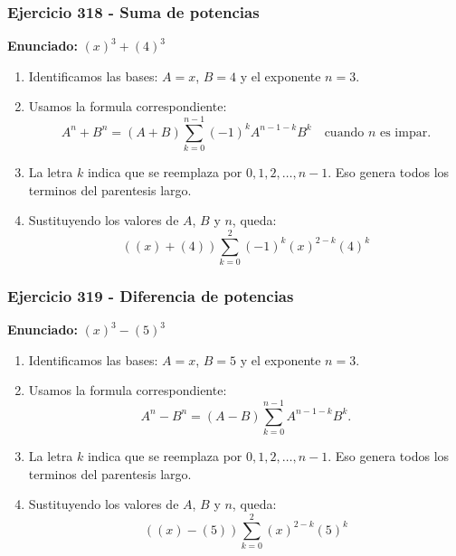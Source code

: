 \documentclass[11pt,a4paper]{article}
\begin{document}
\subsubsection*{Ejercicio 318 - Suma de potencias}
\textbf{Enunciado:} $ \left(x\right)^{3}+\left(4\right)^{3} $\par
\begin{enumerate}[leftmargin=2em]
\item Identificamos las bases: \(A=x\), \(B=4\) y el exponente \(n=3\).
\item Usamos la formula correspondiente: \[A^n+B^n=(A+B)\sum_{k=0}^{n-1}(-1)^kA^{n-1-k}B^k\quad\text{cuando }n\text{ es impar}.\]
\item La letra \(k\) indica que se reemplaza por \(0,1,2,\ldots,n-1\). Eso genera todos los terminos del parentesis largo.
\item Sustituyendo los valores de \(A\), \(B\) y \(n\), queda: \[\boxed{\left(\left(x\right)+\left(4\right)\right)\sum_{k=0}^{2}(-1)^k\left(x\right)^{2-k}\left(4\right)^k}\]
\end{enumerate}

\vspace{0.2cm}
\subsubsection*{Ejercicio 319 - Diferencia de potencias}
\textbf{Enunciado:} $ \left(x\right)^{3}-\left(5\right)^{3} $\par
\begin{enumerate}[leftmargin=2em]
\item Identificamos las bases: \(A=x\), \(B=5\) y el exponente \(n=3\).
\item Usamos la formula correspondiente: \[A^n-B^n=(A-B)\sum_{k=0}^{n-1}A^{n-1-k}B^k.\]
\item La letra \(k\) indica que se reemplaza por \(0,1,2,\ldots,n-1\). Eso genera todos los terminos del parentesis largo.
\item Sustituyendo los valores de \(A\), \(B\) y \(n\), queda: \[\boxed{\left(\left(x\right)-\left(5\right)\right)\sum_{k=0}^{2}\left(x\right)^{2-k}\left(5\right)^k}\]
\end{enumerate}

\vspace{0.2cm}
\end{document}
